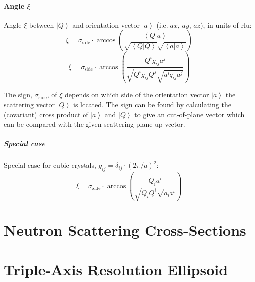 \documentclass[english]{book}
\begin{document}
\subsubsection*{Angle $\xi$}
Angle $\xi$ between $\left| Q \right>$ and orientation vector $\left| a \right>$ (i.e. $ax$, $ay$, $az$), in units of rlu:
\begin{equation} \xi = \sigma_{\mathrm{side}} \cdot \arccos \left( \frac{ \left< Q | a \right> }{ \sqrt{\left< Q | Q \right>} \sqrt{\left< a | a \right>} } \right) \end{equation}
\begin{equation} \boxed{ \xi = \sigma_{\mathrm{side}} \cdot \arccos \left( \frac{ Q^i g_{ij} a^j }{ \sqrt{Q^i g_{ij} Q^j} \sqrt{a^i g_{ij} a^j} } \right) } \end{equation}

The sign, $\sigma_{\mathrm{side}}$, of $\xi$ depends on which side of the orientation vector $\left| a \right>$ the scattering vector $\left| Q \right>$ is located. The sign can be found by calculating the (covariant) cross product of $\left| a \right>$ and $\left| Q \right>$ to give an out-of-plane vector which can be compared with the given scattering plane up vector.


\paragraph*{Special case}
Special case for cubic crystals, $g_{ij} = \delta_{ij} \cdot \left( 2\pi / a \right)^2$:
\begin{equation} \xi = \sigma_{\mathrm{side}} \cdot \arccos \left( \frac{ Q_i a^i }{ \sqrt{Q_i Q^i} \sqrt{a_i a^i} } \right) \end{equation}





\chapter{Neutron Scattering Cross-Sections}





\chapter{Triple-Axis Resolution Ellipsoid}

\end{document}
